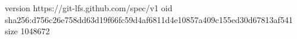 version https://git-lfs.github.com/spec/v1
oid sha256:d756c26e758dd63d19f66fc59d4af6811d4e10857a409c155ed30d67813af541
size 1048672
